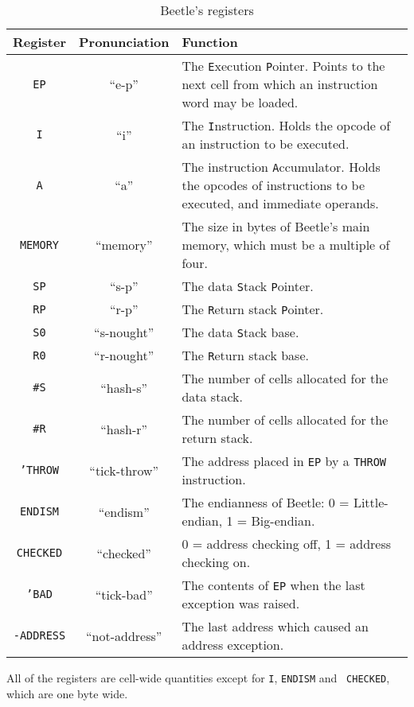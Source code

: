 \documentclass{article}
\begin{document}
\begin{table}[htbp]
\begin{center}
\begin{tabular}{ccp{3.75in}} \toprule
\bf Register & \bf Pronunciation & \bf Function \\
    \midrule
{\tt EP} & ``e-p'' & The {\tt E}xecution {\tt P}ointer. Points to the next
    cell from which an instruction word may be loaded. \\
{\tt I} & ``i'' & The {\tt I}nstruction. Holds the opcode of an instruction
    to be executed. \\
{\tt A} & ``a'' & The instruction {\tt A}ccumulator. Holds the opcodes of
    instructions to be executed, and immediate operands. \\
{\tt MEMORY} & ``memory'' & The size in bytes of Beetle's main memory,
    which must be a multiple of four. \\
{\tt SP} & ``s-p'' & The data {\tt S}tack {\tt P}ointer. \\
{\tt RP} & ``r-p'' & The {\tt R}eturn stack {\tt P}ointer. \\
{\tt S0} & ``s-nought'' & The data {\tt S}tack base. \\
{\tt R0} & ``r-nought'' & The {\tt R}eturn stack base. \\
{\tt \#S} & ``hash-s'' & The number of cells allocated for the data stack. \\
{\tt \#R} & ``hash-r'' & The number of cells allocated for the return stack. \\
{\tt 'THROW} & ``tick-throw'' & The address placed in {\tt EP} by a {\tt THROW}
    instruction. \\
{\tt ENDISM} & ``endism'' & The endianness of Beetle: 0 = Little-endian,
    1 = Big-endian. \\
{\tt CHECKED} & ``checked'' & 0 = address checking off, 1 = address checking
    on. \\
{\tt 'BAD} & ``tick-bad'' & The contents of {\tt EP} when the last exception
    was raised. \\
{\tt -ADDRESS} & ``not-address'' & The last address which caused an address
    exception. \\ \bottomrule
\end{tabular}
\caption{\label{regtable}Beetle's registers}
\end{center}
\end{table}

All of the registers are cell-wide quantities except for {\tt I}, {\tt ENDISM} and {\tt
CHECKED}, which are one byte wide.
\end{document}
